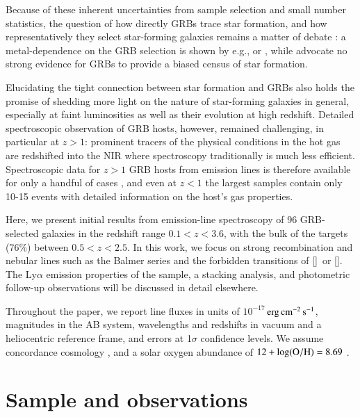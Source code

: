 \documentclass[traditabstract, longauth]{aa}
\newcommand{\erg}{$\rm{erg\,cm^{-2}\,s^{-1}}$}
\newcommand{\oh}{12+\log(\rm{O/H})}
\newcommand{\oii}{[\ion{O}{ii}]}
\newcommand{\oiii}{[\ion{O}{iii}]}
\begin{document}
Because of these inherent uncertainties from sample selection and small number statistics, the question of how directly GRBs trace star formation, and how representatively they select star-forming galaxies remains a matter of debate \citep[e.g.,][]{2012ApJ...755...85M, 2014arXiv1409.7064V, 2015arXiv150304246S}: a metal-dependence on the GRB selection is shown by e.g., \citet{2013ApJ...774..119G} or \citet{2013ApJ...778..128P}, while \citet{2014A&A...565A.112H} advocate no strong evidence for GRBs to provide a biased census of star formation.
 
Elucidating the tight connection between star formation and GRBs also holds the promise of shedding more light on the nature of star-forming galaxies in general, especially at faint luminosities as well as their evolution at high redshift. Detailed spectroscopic observation of GRB hosts, however, remained challenging, in particular at $z>1$: prominent tracers of the physical conditions in the hot gas are redshifted into the NIR where spectroscopy traditionally is much less efficient. Spectroscopic data for $z > 1$ GRB hosts from emission lines is therefore available for only a handful of cases \citep[e.g.,][]{2012MNRAS.419.3039C, 2014arXiv1409.6315F, 2015Silviasubm}, and even at $z < 1$ the largest samples \citep{2009ApJ...691..182S, 2010AJ....139..694L, 2013ApJ...774..119G} contain only 10-15 events with detailed information on the host's gas properties.

Here, we present initial results from emission-line spectroscopy of 96 GRB-selected galaxies in the redshift range $0.1<z<3.6$, with the bulk of the targets (76\%) between $0.5<z<2.5$. In this work, we focus on strong recombination and nebular lines such as the Balmer series and the forbidden transitions of \oii\, or \oiii. The Ly$\alpha$ emission properties of the sample, a stacking analysis, and photometric follow-up observations will be discussed in detail elsewhere. 

Throughout the paper, we report line fluxes in units of $10^{-17}\,$\erg, magnitudes in the AB system, wavelengths and redshifts in vacuum and a heliocentric reference frame, and errors at 1$\sigma$ confidence levels. We assume concordance cosmology \citep[][$\Omega_{\rm{m}}=0.315$, $\Omega_\Lambda=0.685$, $H_0=67.3\,\rm{km}\,s^{-1}\, Mpc^{-1}$]{2014A&A...571A..16P}, and a solar oxygen abundance of $\oh=8.69$ \citep{2009ARA&A..47..481A}.

\section{Sample and observations}

\end{document}
